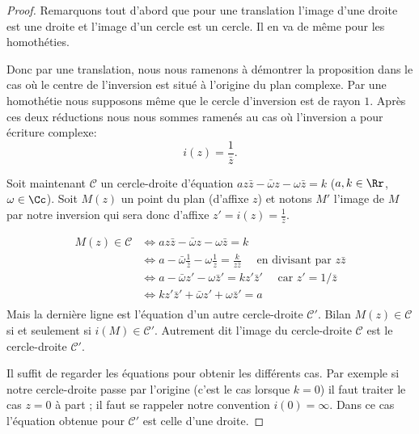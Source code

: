 \documentclass[11pt,class=report,crop=false]{standalone}
\newcommand{\inversion}{i}
\begin{document}
\begin{proof}
Remarquons tout d'abord que pour une translation l'image d'une droite est une droite et l'image d'un cercle est un cercle.
Il en va de même pour les homothéties.

Donc par une translation, nous nous ramenons à démontrer la proposition dans le cas où le centre de l'inversion est situé à l'origine du plan complexe. Par une homothétie nous supposons même
que le cercle d'inversion est de rayon $1$.
Après ces deux réductions nous nous sommes ramenés au cas où l'inversion a pour écriture complexe:
$$\inversion(z) = \frac{1}{\bar z}.$$

Soit maintenant $\mathcal{C}$ un cercle-droite d'équation
$az\bar z - \bar \omega z - \omega \bar z = k$
($a,k\in \Rr$, $\omega \in \Cc$).
Soit $M(z)$ un point du plan (d'affixe $z$) et notons
$M'$ l'image de $M$ par notre inversion
qui sera donc d'affixe $z' = \inversion(z) = \frac{1}{\bar z}$.

\begin{align*}
 M(z) \in \mathcal{C} 
   &\iff  az\bar z - \bar \omega z - \omega \bar z = k \\
   &\iff a - \bar \omega\frac{1}{\bar z} - \omega \frac 1 z = \frac{k}{ z\bar z} \quad \text{ en divisant par } z\bar z \\
   &\iff a - \bar \omega z' - \omega \bar z' = k z' \bar z' \quad \text{ car } z' = 1/\bar z\\
   &\iff k z' \bar z' + \bar \omega z' + \omega \bar z' = a \\
\end{align*}
Mais la dernière ligne est l'équation d'un autre cercle-droite $\mathcal{C}'$.
Bilan $M(z) \in \mathcal{C}$ si et seulement si $\inversion(M) \in \mathcal{C}'$.
Autrement dit l'image du cercle-droite $\mathcal{C}$ est le cercle-droite $\mathcal{C}'$.

Il suffit de regarder les équations pour obtenir les différents cas. Par exemple si notre cercle-droite passe par l'origine (c'est le cas lorsque $k=0$) il faut traiter le cas $z=0$ à part ; il faut se rappeler notre convention $\inversion(0) = \infty$. Dans ce cas l'équation obtenue pour $\mathcal{C}'$ est celle d'une droite.


\end{proof}
\end{document}
